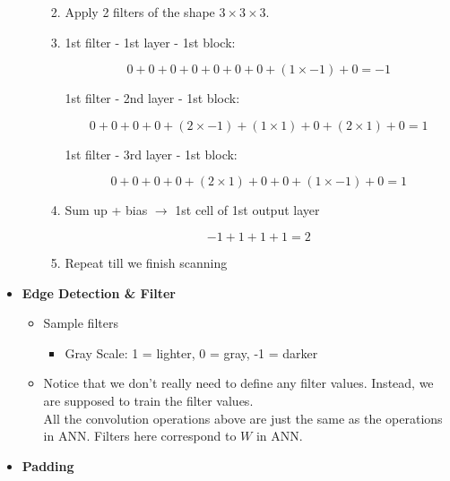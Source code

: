 \documentclass[
]{book}
\providecommand{\tightlist}{%
  \setlength{\itemsep}{0pt}\setlength{\parskip}{0pt}}
\begin{document}
\begin{itemize}
\begin{itemize}
    \begin{enumerate}
    \def\labelenumi{\arabic{enumi}.}
    \item
      Apply 2 filters of the shape \(3\times3\times3\).
    \item
      1st filter - 1st layer - 1st block:

      \[\begin{equation}
       0+0+0+0+0+0+0+(1\times-1)+0=-1
       \end{equation}\]

      1st filter - 2nd layer - 1st block:

      \[\begin{equation}
       0+0+0+0+(2\times-1)+(1\times1)+0+(2\times1)+0=1
       \end{equation}\]

      1st filter - 3rd layer - 1st block:

      \[\begin{equation}
       0+0+0+0+(2\times1)+0+0+(1\times-1)+0=1
       \end{equation}\]
    \item
      Sum up + bias \(\rightarrow\) 1st cell of 1st output layer

      \[\begin{equation}
       -1+1+1+1=2
       \end{equation}\]
    \item
      Repeat till we finish scanning\\
    \end{enumerate}
  \end{itemize}
\item
  \textbf{Edge Detection \& Filter}

  \begin{itemize}
  \item
    Sample filters

    \begin{itemize}
    \tightlist
    \item
      Gray Scale: 1 = lighter, 0 = gray, -1 = darker\\
    \end{itemize}
  \item
    Notice that we don't really need to define any filter values.
    Instead, we are supposed to train the filter values.\\
    All the convolution operations above are just the same as the
    operations in ANN. Filters here correspond to \(W\) in ANN.
  \end{itemize}
\item
  \textbf{Padding}


\end{itemize}
\end{document}
